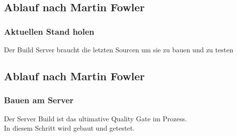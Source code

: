 \documentclass[hyperref={pdfpagelabels=false}]{beamer}
\begin{document}
\subsection{Ablauf nach Martin Fowler}
\begin{frame} [t]
\frametitle{Aktuellen Stand holen}
\begin{figure}[h]
  \centering
\end{figure}
\vspace{0.5cm} 
Der Build Server braucht die letzten Sourcen um sie zu bauen und zu testen
\end{frame}

\subsection{Ablauf nach Martin Fowler}
\begin{frame} [t]
\frametitle{Bauen am Server}
\begin{figure}[h]
  \centering
\end{figure}
\vspace{0.5cm} 
Der Server Build ist das ultimative Quality Gate im Prozess.\\
In diesem Schritt wird gebaut und getestet.
\end{frame}
\end{document}
